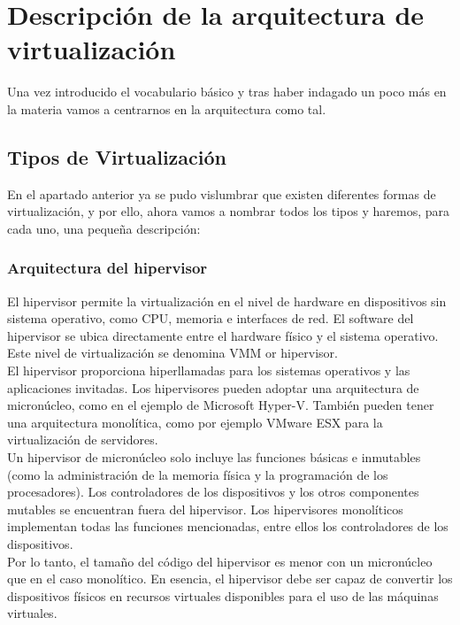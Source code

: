 \chapter{Descripción de la arquitectura de virtualización}

\lettrine[lines=1,slope=4pt,findent=0pt]{U}{}na vez introducido el vocabulario básico y tras haber indagado un poco más en la materia vamos a centrarnos en la arquitectura como tal.\\

\section{Tipos de Virtualización}
En el apartado anterior ya se pudo vislumbrar que existen diferentes formas de virtualización, y por ello, ahora vamos a nombrar todos los tipos y haremos, para cada uno, una pequeña descripción:

\subsection{Arquitectura del hipervisor}
El hipervisor permite la virtualización en el nivel de hardware en dispositivos sin sistema operativo, como CPU, memoria e interfaces de red. El software del hipervisor se ubica directamente entre el hardware físico y el sistema operativo. Este nivel de virtualización se denomina VMM or hipervisor.\\

El hipervisor proporciona hiperllamadas para los sistemas operativos y las aplicaciones invitadas. Los hipervisores pueden adoptar una arquitectura de micronúcleo, como en el ejemplo de Microsoft Hyper-V. También pueden tener una arquitectura monolítica, como por ejemplo VMware ESX para la virtualización de servidores.\\

Un hipervisor de micronúcleo solo incluye las funciones básicas e inmutables (como la administración de la memoria física y la programación de los procesadores). Los controladores de los dispositivos y los otros componentes mutables se encuentran fuera del hipervisor. Los hipervisores monolíticos implementan todas las funciones mencionadas, entre ellos los controladores de los dispositivos.\\

Por lo tanto, el tamaño del código del hipervisor es menor con un micronúcleo que en el caso monolítico. En esencia, el hipervisor debe ser capaz de convertir los dispositivos físicos en recursos virtuales disponibles para el uso de las máquinas virtuales.

